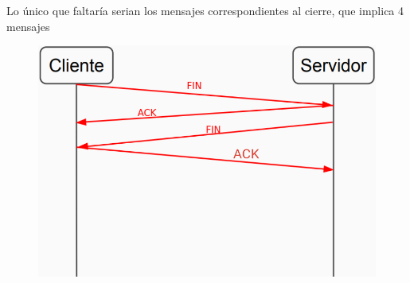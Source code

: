 Lo único que faltaría serian los mensajes correspondientes al cierre, que implica 4 mensajes

\begin{figure}[H]
\centering
\includegraphics[width=\textwidth]{imagenes/resolucion6.png}
\end{figure}